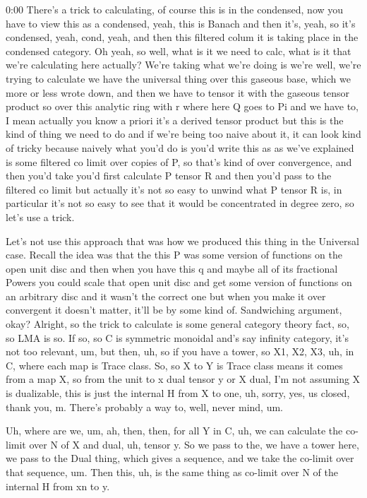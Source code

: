 \begin{unfinished}{0:00}
There's a trick to calculating, of course this is in the condensed, now you have to view this as a condensed, yeah, this is Banach and then it's, yeah, so it's condensed, yeah, cond, yeah, and then this filtered colum it is taking place in the condensed category. Oh yeah, so well, what is it we need to calc, what is it that we're calculating here actually? We're taking what we're doing is we're well, we're trying to calculate we have the universal thing over this gaseous base, which we more or less wrote down, and then we have to tensor it with the gaseous tensor product so over this analytic ring with r where here Q goes to Pi and we have to, I mean actually you know a priori it's a derived tensor product but this is the kind of thing we need to do and if we're being too naive about it, it can look kind of tricky because naively what you'd do is you'd write this as as we've explained is some filtered co limit over copies of P, so that's kind of over convergence, and then you'd take you'd first calculate P tensor R and then you'd pass to the filtered co limit but actually it's not so easy to unwind what P tensor R is, in particular it's not so easy to see that it would be concentrated in degree zero, so let's use a trick.

Let's not use this approach that was how we produced this thing in the Universal case. Recall the idea was that the this P was some version of functions on the open unit disc and then when you have this q and maybe all of its fractional Powers you could scale that open unit disc and get some version of functions on an arbitrary disc and it wasn't the correct one but when you make it over convergent it doesn't matter, it'll be by some kind of.
Sandwiching argument, okay? Alright, so the trick to calculate is some general category theory fact, so, so LMA is so. If so, so C is symmetric monoidal and's say infinity category, it's not too relevant, um, but then, uh, so if you have a tower, so X1, X2, X3, uh, in C, where each map is Trace class. So, so X to Y is Trace class means it comes from a map X, so from the unit to x dual tensor y or X dual, I'm not assuming X is dualizable, this is just the internal H from X to one, uh, sorry, yes, us closed, thank you, m. There's probably a way to, well, never mind, um.

Uh, where are we, um, ah, then, then, for all Y in C, uh, we can calculate the co-limit over N of X and dual, uh, tensor y. So we pass to the, we have a tower here, we pass to the Dual thing, which gives a sequence, and we take the co-limit over that sequence, um. Then this, uh, is the same thing as co-limit over N of the internal H from xn to y.


\end{unfinished}
